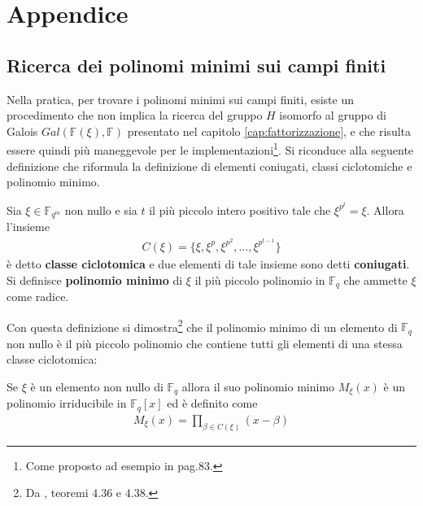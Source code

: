 
\chapter{Appendice}


\section{Ricerca dei polinomi minimi sui campi finiti}
Nella pratica, per trovare i polinomi minimi sui campi finiti, esiste un procedimento che non implica la ricerca del gruppo $H$ isomorfo al gruppo di Galois $Gal(\mathbb{F}(\xi), \mathbb{F})$ presentato nel capitolo \ref{cap:fattorizzazione}, e che risulta essere quindi più maneggevole per le implementazioni\footnote{Come proposto ad esempio in \cite{cattaneo} pag.83.}. Si riconduce alla seguente definizione che riformula la definizione di elementi coniugati, classi ciclotomiche e polinomio minimo.
\begin{definizione}
   Sia $\xi \in \mathbb{F}_{q^m}$ non nullo e sia $t$ il più piccolo intero positivo tale che $\xi^{p^{t}} = \xi$. Allora l'insieme
   \begin{align*}
      C(\xi) = \lbrace \xi, \xi^{p}, \xi^{p^{2}}, \dots ,\xi^{p^{t-1}} \rbrace
   \end{align*}
   è detto {\bf classe ciclotomica} e due elementi di tale insieme sono detti {\bf coniugati}.\\
   Si definisce {\bf polinomio minimo} di $\xi$ il più piccolo polinomio in $\mathbb{F}_{q}$ che ammette $\xi$ come radice.
\end{definizione}
\noindent
Con questa definizione si dimostra\footnote{Da \cite{cattaneo}, teoremi $4.36$ e $4.38$.} che il polinomio minimo di un elemento di $\mathbb{F}_{q}$ non nullo è il più piccolo polinomio che contiene tutti gli elementi di una stessa classe ciclotomica:
\begin{teorema}
   Se $\xi$ è un elemento non nullo di $\mathbb{F}_{q}$ allora il suo polinomio minimo $M_{\xi}(x)$ è un polinomio irriducibile in $\mathbb{F}_{q}[x]$ ed è definito come
   \begin{align*}
      M_{\xi}(x) = \prod_{\beta \in C(\xi)} (x-\beta)
   \end{align*}
\end{teorema}
